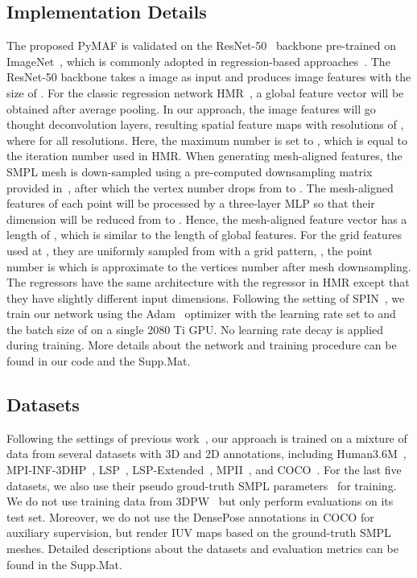 \documentclass[10pt,twocolumn,letterpaper]{article}
\begin{document}
\subsection{Implementation Details}

The proposed PyMAF is validated on the ResNet-50~\cite{he2016deep} backbone pre-trained on ImageNet~\cite{deng2009imagenet}, which is commonly adopted in regression-based approaches~\cite{kanazawa2018end,kolotouros2019convolutional,kolotouros2019learning}.
The ResNet-50 backbone takes a  image as input and produces image features with the size of .
For the classic regression network HMR~\cite{kanazawa2018end}, a  global feature vector will be obtained after average pooling.
In our approach, the image features will go thought deconvolution layers, resulting spatial feature maps with resolutions of , where  for all resolutions.
Here, the maximum number  is set to , which is equal to the iteration number used in HMR.
When generating mesh-aligned features, the SMPL mesh is down-sampled using a pre-computed downsampling matrix provided in~\cite{kolotouros2019convolutional}, after which the vertex number drops from  to .
The mesh-aligned features of each point will be processed by a three-layer MLP so that their dimension will be reduced from  to .
Hence, the mesh-aligned feature vector has a length of , which is similar to the length of global features.
For the grid features used at , they are uniformly sampled from  with a  grid pattern, \ie, the point number is  which is approximate to the vertices number  after mesh downsampling.
The regressors  have the same architecture with the regressor in HMR except that they have slightly different input dimensions.
Following the setting of SPIN~\cite{kolotouros2019learning}, we train our network using the Adam~\cite{kingma2014adam} optimizer with the learning rate set to  and the batch size of  on a single 2080 Ti GPU.
No learning rate decay is applied during training.
More details about the network and training procedure can be found in our code and the Supp.Mat.

\subsection{Datasets}
Following the settings of previous work~\cite{kanazawa2018end,kolotouros2019learning}, our approach is trained on a mixture of data from several datasets with 3D and 2D annotations, including Human3.6M~\cite{ionescu2014human3}, MPI-INF-3DHP~\cite{mehta2017monocular}, LSP~\cite{johnson2010clustered}, LSP-Extended~\cite{johnson2011learning}, MPII~\cite{andriluka20142d}, and COCO~\cite{lin2014microsoft}.
For the last five datasets, we also use their pseudo groud-truth SMPL parameters~\cite{bogo2016keep,kolotouros2019learning} for training.
We do not use training data from 3DPW~\cite{von2018recovering} but only perform evaluations on its test set.
Moreover, we do not use the DensePose annotations in COCO for auxiliary supervision, but render IUV maps based on the ground-truth SMPL meshes.
Detailed descriptions about the datasets and evaluation metrics can be found in the Supp.Mat.
\end{document}
